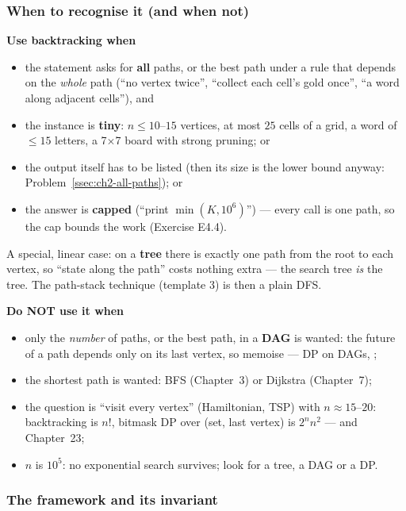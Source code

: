 \subsubsection*{When to recognise it (and when not)}

\textbf{Use backtracking when}
\begin{itemize}[leftmargin=*]
    \item the statement asks for \textbf{all} paths, or the best path under a rule that depends on the \emph{whole} path (``no vertex twice'', ``collect each cell's gold once'', ``a word along adjacent cells''), and
    \item the instance is \textbf{tiny}: $n \le 10$--$15$ vertices, at most $25$ cells of a grid, a word of $\le 15$ letters, a 7$\times$7 board with strong pruning; or
    \item the output itself has to be listed (then its size is the lower bound anyway: Problem~\ref{ssec:ch2-all-paths}); or
    \item the answer is \textbf{capped} (``print $\min(K, 10^6)$'') --- every call is one path, so the cap bounds the work (Exercise E4.4).
\end{itemize}
A special, linear case: on a \textbf{tree} there is exactly one path from the root to each vertex, so ``state along the path'' costs nothing extra --- the search tree \emph{is} the tree. The path-stack technique (template 3) is then a plain DFS.

\textbf{Do NOT use it when}
\begin{itemize}[leftmargin=*]
    \item only the \emph{number} of paths, or the best path, in a \textbf{DAG} is wanted: the future of a path depends only on its last vertex, so memoise --- DP on DAGs, ;
    \item the shortest path is wanted: BFS (Chapter~3) or Dijkstra (Chapter~7);
    \item the question is ``visit every vertex'' (Hamiltonian, TSP) with $n \approx 15$--$20$: backtracking is $n!$, bitmask DP over (set, last vertex) is $2^n n^2$ ---  and Chapter~23;
    \item $n$ is $10^5$: no exponential search survives; look for a tree, a DAG or a DP.
\end{itemize}

\subsubsection*{The framework and its invariant}

